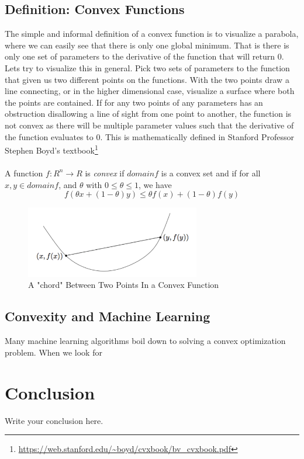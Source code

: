 \documentclass{article}
\begin{document}
\subsection{Definition: Convex Functions}
The simple and informal definition of a convex function is to visualize a parabola, where we can easily see that there is only one global minimum. That is there is only one set of parameters to the derivative of the function that will return 0. Lets try to visualize this in general. Pick two sets of parameters to the function that given us two different points on the functions. With the two points draw a line connecting, or in the higher dimensional case, visualize a surface where both the points are contained. If for any two points of any parameters has an obstruction disallowing a line of sight from one point to another, the function is not convex as there will be multiple parameter values such that the derivative of the function evaluates to 0. This is mathematically defined in Stanford Professor Stephen Boyd's textbook\footnote{\url{https://web.stanford.edu/~boyd/cvxbook/bv_cvxbook.pdf}} \\
\\
A function $f:R^n \rightarrow R$ is \textit{convex} if $domain f$ is a convex set and if for all $x,y \in domain f$, and $\theta$ with $0 \leq \theta \leq 1$, we have
\begin{equation}
    \label{simple_equation}
    f(\theta x + (1 - \theta)y) \leq \theta f(x) + (1 - \theta)f(y)
\end{equation}
\begin{figure}[h]
    \centering
    \includegraphics[width=3.0in]{convexboyd}
    \caption{A "chord" Between Two Points In a Convex Function}
    \label{convexboyd}
\end{figure}

\subsection{Convexity and Machine Learning}
Many machine learning algorithms boil down to solving a convex optimization problem. When we look for 
\\


\section{Conclusion}
Write your conclusion here.
\end{document}
